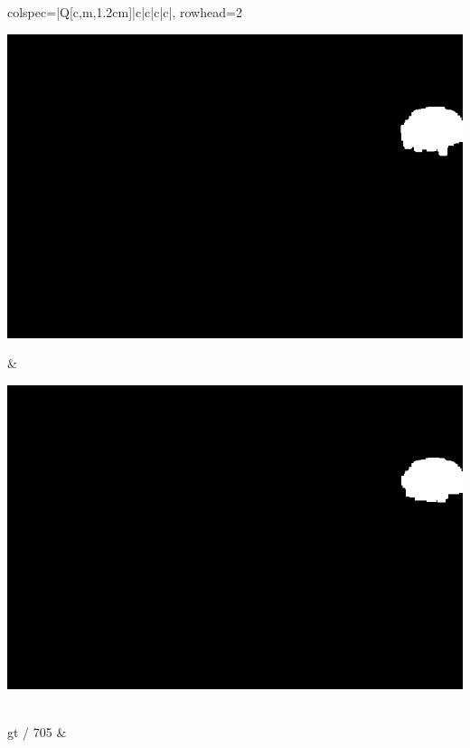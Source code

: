 \begin{longtblr}[
            caption = {Hasil uji coba proses \textit{background subtraction} menggunakan GMM yang disempurnakan oleh Operasi Morfologi},
            label = {tab:gmm_morph_9908}
        ]{
            colspec={|Q[c,m,1.2cm]|c|c|c|c|},
            rowhead=2
        }
\begin{minipage}{0.19\textwidth}
                \includegraphics[width=\linewidth]{image/9866/9866_dilated_5x11_frame849.jpg}
            \end{minipage} & 
            \begin{minipage}{0.19\textwidth}
                \includegraphics[width=\linewidth]{image/9866/9866_dilated_7x13_frame849.jpg}
            \end{minipage} \\
            \hline
            gt / 705 &
            \begin{minipage}{0.19\textwidth}

\end{minipage}
\end{longtblr}

